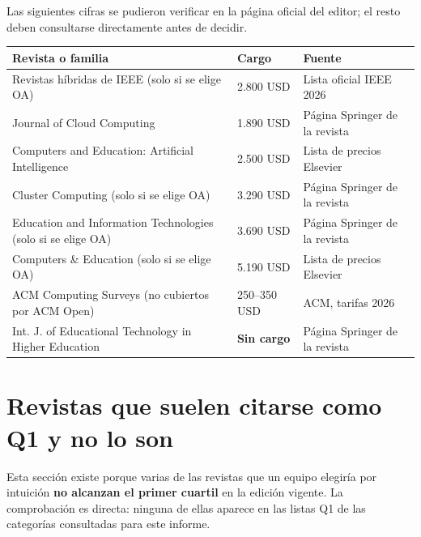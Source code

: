 \documentclass[11pt,a4paper]{article}
\begin{document}
Las siguientes cifras se pudieron verificar en la página oficial del editor; el resto deben consultarse directamente antes de decidir.

\begin{center}
	\small
	\begin{tabular}{@{}p{6.6cm}p{4.0cm}p{4.2cm}@{}}
		\toprule
		\textbf{Revista o familia} & \textbf{Cargo} & \textbf{Fuente} \\
		\midrule
		Revistas híbridas de IEEE (solo si se elige OA) & 2.800 USD & Lista oficial IEEE 2026 \\
		Journal of Cloud Computing & 1.890 USD & Página Springer de la revista \\
		Computers and Education: Artificial Intelligence & 2.500 USD & Lista de precios Elsevier \\
		Cluster Computing (solo si se elige OA) & 3.290 USD & Página Springer de la revista \\
		Education and Information Technologies (solo si se elige OA) & 3.690 USD & Página Springer de la revista \\
		Computers \& Education (solo si se elige OA) & 5.190 USD & Lista de precios Elsevier \\
		ACM Computing Surveys (no cubiertos por ACM Open) & 250--350 USD & ACM, tarifas 2026 \\
		Int. J. of Educational Technology in Higher Education & \textbf{Sin cargo} & Página Springer de la revista \\
		\bottomrule
	\end{tabular}
\end{center}

\section{Revistas que suelen citarse como Q1 y no lo son}
\label{sec:desmentidos}

Esta sección existe porque varias de las revistas que un equipo elegiría por intuición \textbf{no alcanzan el primer cuartil} en la edición vigente. La comprobación es directa: ninguna de ellas aparece en las listas Q1 de las categorías consultadas para este informe.
\end{document}
